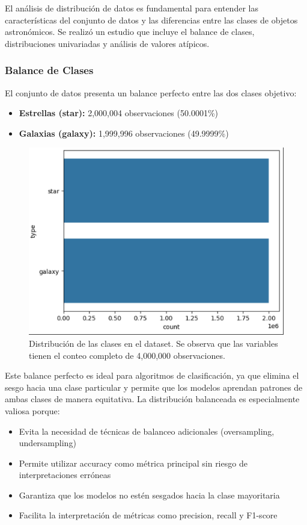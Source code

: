 \documentclass{article}
\begin{document}
El análisis de distribución de datos es fundamental para entender las características del conjunto de datos y las diferencias entre las clases de objetos astronómicos. Se realizó un estudio que incluye el balance de clases, distribuciones univariadas y análisis de valores atípicos.

\subsubsection{Balance de Clases}

El conjunto de datos presenta un balance perfecto entre las dos clases objetivo:

\begin{itemize}
    \item \textbf{Estrellas (star):} 2,000,004 observaciones (50.0001\%)
    \item \textbf{Galaxias (galaxy):} 1,999,996 observaciones (49.9999\%)
\end{itemize}

\begin{figure}[H]
    \centering
    \includegraphics[width=0.5\linewidth]{count.png}
    \caption{Distribución de las clases en el dataset. Se observa que las variables tienen el conteo completo de 4,000,000 observaciones.}
    \label{fig:count}
\end{figure}


Este balance perfecto es ideal para algoritmos de clasificación, ya que elimina el sesgo hacia una clase particular y permite que los modelos aprendan patrones de ambas clases de manera equitativa. La distribución balanceada es especialmente valiosa porque:

\begin{itemize}
    \item Evita la necesidad de técnicas de balanceo adicionales (oversampling, undersampling)
    \item Permite utilizar accuracy como métrica principal sin riesgo de interpretaciones erróneas
    \item Garantiza que los modelos no estén sesgados hacia la clase mayoritaria
    \item Facilita la interpretación de métricas como precision, recall y F1-score
\end{itemize}
\end{document}
